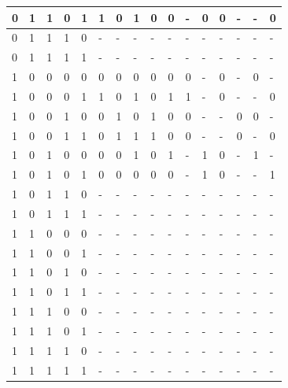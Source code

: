 \documentclass[titlepage]{article}
\begin{document}
\begin{center}
\begin{tabular}{|l|l|l|l|l|l|l|l|l|l|l|l|l|l|l|l|}
\hline
0 & 1 & 1 & 0 & 1 & 1 & 0 & 1 & 0 & 0 & - & 0 & 0 & - & - & 0 \\
\hline
0 & 1 & 1 & 1 & 0 & - & - & - & - & - & - & - & - & - & - & - \\
\hline
0 & 1 & 1 & 1 & 1 & - & - & - & - & - & - & - & - & - & - & - \\
\hline
1 & 0 & 0 & 0 & 0 & 0 & 0 & 0 & 0 & 0 & 0 & - & 0 & - & 0 & - \\
\hline
1 & 0 & 0 & 0 & 1 & 1 & 0 & 1 & 0 & 1 & 1 & - & 0 & - & - & 0 \\
\hline
1 & 0 & 0 & 1 & 0 & 0 & 1 & 0 & 1 & 0 & 0 & - & - & 0 & 0 & - \\
\hline
1 & 0 & 0 & 1 & 1 & 0 & 1 & 1 & 1 & 0 & 0 & - & - & 0 & - & 0 \\
\hline
1 & 0 & 1 & 0 & 0 & 0 & 0 & 1 & 0 & 1 & - & 1 & 0 & - & 1 & - \\
\hline
1 & 0 & 1 & 0 & 1 & 0 & 0 & 0 & 0 & 0 & - & 1 & 0 & - & - & 1 \\
\hline
1 & 0 & 1 & 1 & 0 & - & - & - & - & - & - & - & - & - & - & - \\
\hline
1 & 0 & 1 & 1 & 1 & - & - & - & - & - & - & - & - & - & - & - \\
\hline
1 & 1 & 0 & 0 & 0 & - & - & - & - & - & - & - & - & - & - & - \\
\hline
1 & 1 & 0 & 0 & 1 & - & - & - & - & - & - & - & - & - & - & - \\
\hline
1 & 1 & 0 & 1 & 0 & - & - & - & - & - & - & - & - & - & - & - \\
\hline
1 & 1 & 0 & 1 & 1 & - & - & - & - & - & - & - & - & - & - & - \\
\hline
1 & 1 & 1 & 0 & 0 & - & - & - & - & - & - & - & - & - & - & - \\
\hline
1 & 1 & 1 & 0 & 1 & - & - & - & - & - & - & - & - & - & - & - \\
\hline
1 & 1 & 1 & 1 & 0 & - & - & - & - & - & - & - & - & - & - & - \\
\hline
1 & 1 & 1 & 1 & 1 & - & - & - & - & - & - & - & - & - & - & - \\
\hline
\end{tabular}
\end{center}
\clearpage
\end{document}
